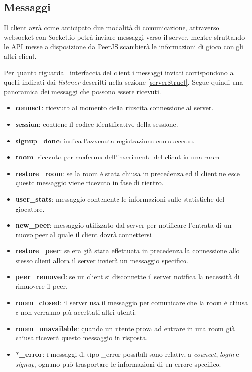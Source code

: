 \newpage
\subsection{Messaggi}
Il client avrà come anticipato due modalità di comunicazione, attraverso websocket con Socket.io potrà inviare messaggi verso il server, mentre sfruttando le API messe a disposizione da PeerJS scambierà le informazioni di gioco con gli altri client.

Per quanto riguarda l'interfaccia del client i messaggi inviati corrispondono a quelli indicati dai \emph{listener} descritti nella sezione \ref{serverStruct}. Segue quindi una panoramica dei messaggi che possono essere ricevuti.


\begin{itemize}
    \item \textbf{connect}: ricevuto al momento della riuscita connessione al server.
    \item \textbf{session}: contiene il codice identificativo della sessione. 
    \item \textbf{signup\_done}: indica l'avvenuta registrazione con successo.
    \item \textbf{room}: ricevuto per conferma dell'inserimento del client in una room.
    \item \textbf{restore\_room}: se la room è stata chiusa in precedenza ed il client ne esce questo messaggio viene ricevuto in fase di rientro.
    \item \textbf{user\_stats}: messaggio contenente le informazioni sulle statistiche del giocatore.
    \item \textbf{new\_peer}: messaggio utilizzato dal server per notificare l'entrata di un nuovo peer al quale il client dovrà connettersi.
    \item \textbf{restore\_peer}: se era già stata effettuata in precedenza la connessione allo stesso client allora il server invierà un messaggio specifico.
    \item \textbf{peer\_removed}: se un client si disconnette il server notifica la necessità di rimuovere il peer.
    \item \textbf{room\_closed}: il server usa il messaggio per comunicare che la room è chiusa e non verranno più accettati altri utenti.
    \item \textbf{room\_unavailable}: quando un utente prova ad entrare in una room già chiusa riceverà questo messaggio in risposta.
    \item \textbf{*\_error}: i messaggi di tipo \_error possibili sono relativi a \emph{connect}, \emph{login} e \emph{signup}, ognuno può trasportare le informazioni di un errore specifico.
    
\end{itemize}


